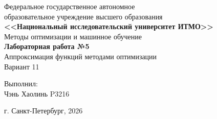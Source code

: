 \begin{titlepage}
    \centering
    Федеральное государственное автономное \\
    образовательное учреждение высшего образования \\
    \textbf{<<Национальный исследовательский университет ИТМО>>} \\

    \vfill
    Методы оптимизации и машинное обучение \\
    \vspace{0.5\baselineskip}
    \textbf{Лабораторная работа №5} \\
    \vspace{0.5\baselineskip}
    Аппроксимация функций методами оптимизации \\
    \vspace{0.5\baselineskip}
    Вариант 11 \\

    \vfill

    \flushright
    Выполнил:\\
    Чэнь Хаолинь P3216\\

    \vspace{4\baselineskip}

    \centering
    г. Санкт-Петербург, 2026

\end{titlepage}
